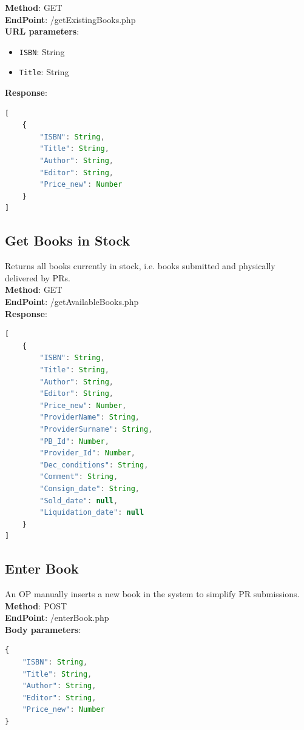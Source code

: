 \textbf{Method}: GET \\
\textbf{EndPoint}: /getExistingBooks.php \\
\textbf{URL parameters}:
\begin{itemize}
    \item \texttt{ISBN}: String
    \item \texttt{Title}: String
\end{itemize}

\textbf{Response}:
\begin{lstlisting}[language=JavaScript, basicstyle=\ttfamily]
[
    {
        "ISBN": String,
        "Title": String,
        "Author": String,
        "Editor": String,
        "Price_new": Number
    }
]
\end{lstlisting}

\subsection{Get Books in Stock}
Returns all books currently in stock, i.e. books submitted and physically delivered by PRs.\\

\textbf{Method}: GET \\
\textbf{EndPoint}: /getAvailableBooks.php \\

\textbf{Response}:
\begin{lstlisting}[language=JavaScript, basicstyle=\ttfamily]
[
    {
        "ISBN": String,
        "Title": String,
        "Author": String,
        "Editor": String,
        "Price_new": Number,
        "ProviderName": String,
        "ProviderSurname": String,
        "PB_Id": Number,
        "Provider_Id": Number,
        "Dec_conditions": String,
        "Comment": String,
        "Consign_date": String,
        "Sold_date": null,
        "Liquidation_date": null
    }
]
\end{lstlisting}

\subsection{Enter Book}
An OP manually inserts a new book in the system to simplify PR submissions.\\

\textbf{Method}: POST \\
\textbf{EndPoint}: /enterBook.php \\
\textbf{Body parameters}:
\begin{lstlisting}[language=JavaScript, basicstyle=\ttfamily]
{
    "ISBN": String,
    "Title": String,
    "Author": String,
    "Editor": String,
    "Price_new": Number
}
\end{lstlisting}

